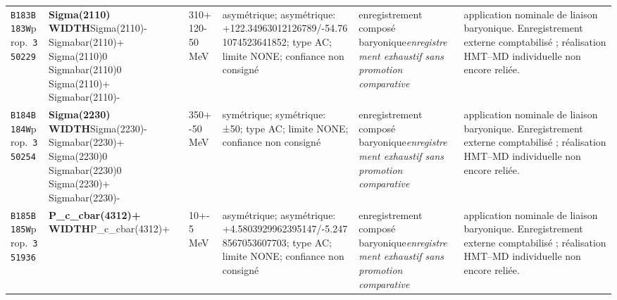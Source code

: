 \begin{landscape}
\begin{longtable}{L{1.85cm}L{4.45cm}L{2.35cm}L{4.05cm}L{3.35cm}L{7.15cm}}
\texttt{B183}\newline \texttt{B183W}\newline prop.\ \texttt{350229} & \textbf{Sigma(2110) WIDTH}\newline Sigma(2110)- \textbar{}\allowbreak{} Sigmabar(2110)+ \textbar{}\allowbreak{} Sigma(2110)0 \textbar{}\allowbreak{} Sigmabar(2110)0 \textbar{}\allowbreak{} Sigma(2110)+ \textbar{}\allowbreak{} Sigmabar(2110)- & 310+120-50\,MeV & asymétrique; asymétrique: +122.34963012126789/-54.761074523641852; type AC; limite NONE; confiance non consigné & enregistrement composé baryonique\newline \emph{enregistrement exhaustif sans promotion comparative} & application nominale de liaison baryonique. Enregistrement externe comptabilisé ; réalisation HMT--MD individuelle non encore reliée. \\
\texttt{B184}\newline \texttt{B184W}\newline prop.\ \texttt{350254} & \textbf{Sigma(2230) WIDTH}\newline Sigma(2230)- \textbar{}\allowbreak{} Sigmabar(2230)+ \textbar{}\allowbreak{} Sigma(2230)0 \textbar{}\allowbreak{} Sigmabar(2230)0 \textbar{}\allowbreak{} Sigma(2230)+ \textbar{}\allowbreak{} Sigmabar(2230)- & 350+-50\,MeV & symétrique; symétrique: ±50; type AC; limite NONE; confiance non consigné & enregistrement composé baryonique\newline \emph{enregistrement exhaustif sans promotion comparative} & application nominale de liaison baryonique. Enregistrement externe comptabilisé ; réalisation HMT--MD individuelle non encore reliée. \\
\texttt{B185}\newline \texttt{B185W}\newline prop.\ \texttt{351936} & \textbf{P\_\allowbreak{}c\_\allowbreak{}cbar(4312)+ WIDTH}\newline P\_\allowbreak{}c\_\allowbreak{}cbar(4312)+ & 10+-5\,MeV & asymétrique; asymétrique: +4.5803929962395147/-5.2478567053607703; type AC; limite NONE; confiance non consigné & enregistrement composé baryonique\newline \emph{enregistrement exhaustif sans promotion comparative} & application nominale de liaison baryonique. Enregistrement externe comptabilisé ; réalisation HMT--MD individuelle non encore reliée. \\

\end{longtable}
\end{landscape}
